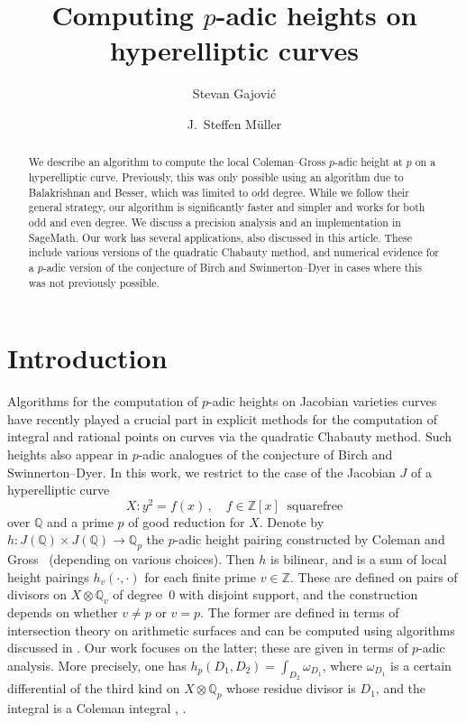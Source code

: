 \documentclass[11pt, a4paper]{amsart}
\author[Stevan Gajovi\'c]{Stevan Gajovi\'c}
\author[J.~Steffen M\"uller]{J.~Steffen M\"uller}
\title[Computing $p$-adic heights on hyperelliptic curves]{Computing $p$-adic heights on
hyperelliptic curves}
\date{}
\newcommand{\Q}{\mathbb{Q}}
\newcommand{\Z}{\mathbb{Z}}
\theoremstyle{remark}
\numberwithin{equation}{section}
\begin{document}
\maketitle

\begin{abstract}
We describe an algorithm to compute the local Coleman--Gross $p$-adic height 
  at $p$ on a hyperelliptic curve. Previously, this was only possible using an algorithm
due to Balakrishnan and Besser, which was limited to odd degree. While we follow
  their general strategy, our
algorithm is significantly faster and simpler and works for both odd and even degree. 
  We discuss a precision analysis and an implementation in SageMath.
  Our work has several applications, also discussed in this article. 
  These include various versions of the 
  quadratic Chabauty method, and numerical evidence 
  for a $p$-adic version of the conjecture of Birch and Swinnerton--Dyer
  in cases where this was not previously possible.
\end{abstract}




\section{Introduction} \label{sec:introduction}

Algorithms for the computation of $p$-adic heights on Jacobian varieties 
curves have recently played a crucial
part in explicit methods for the computation of integral and
rational points on curves via the quadratic Chabauty
method. Such heights also appear in
$p$-adic analogues of the conjecture of Birch and Swinnerton--Dyer.
In this work, we restrict to the case of the Jacobian $J$
of a hyperelliptic curve $$X\colon y^2=f(x)\,,\quad f\in
\Z[x]\;\;\text{squarefree}$$
over $\Q$ and a prime $p$ of good reduction for $X$. 
Denote by
$h\colon J(\Q)\times J(\Q)\to \Q_p$ the $p$-adic height pairing constructed
by Coleman and Gross~\cite{Coleman-Gross-Heights} (depending on various
choices).
Then $h$ is bilinear, and is a sum of local height pairings $h_v(\cdot,\cdot)$
for each finite prime $v\in \Z$. These are defined on pairs of divisors on
$X\otimes \Q_v$ of degree~0 with disjoint support, and the construction 
depends on whether $v\ne p$ or $v=p$.
The former are defined in terms of intersection theory on arithmetic
surfaces and can be computed using algorithms discussed in \cite{Hol12,
Mul14, Raymond-David-Steffen}.
Our work focuses on the latter; these are given
in terms of $p$-adic analysis. 
More precisely, one has $h_p(D_1,D_2)=\int_{D_2}\omega_{D_1}$, where
$\omega_{D_1}$ is a certain differential of the third kind on $X\otimes \Q_p$ whose residue divisor is $D_1$, and  the integral is a Coleman integral
\cite{ColemanI}, \cite{Coleman-deShalit}.
\end{document}
